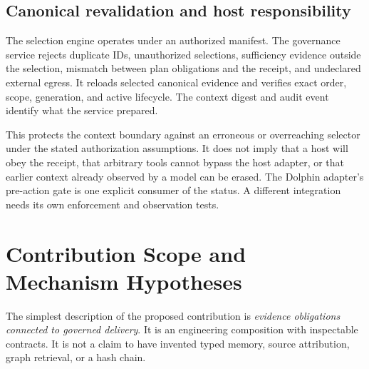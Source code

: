 \documentclass[10pt,twocolumn]{article}
\begin{document}
\subsection{Canonical revalidation and host responsibility}
The selection engine operates under an authorized manifest. The governance service rejects duplicate IDs, unauthorized selections, sufficiency evidence outside the selection, mismatch between plan obligations and the receipt, and undeclared external egress. It reloads selected canonical evidence and verifies exact order, scope, generation, and active lifecycle. The context digest and audit event identify what the service prepared.

This protects the context boundary against an erroneous or overreaching selector under the stated authorization assumptions. It does not imply that a host will obey the receipt, that arbitrary tools cannot bypass the host adapter, or that earlier context already observed by a model can be erased. The Dolphin adapter's pre-action gate is one explicit consumer of the status. A different integration needs its own enforcement and observation tests.

\section{Contribution Scope and Mechanism Hypotheses}
\label{sec:novelty}
The simplest description of the proposed contribution is \emph{evidence obligations connected to governed delivery}. It is an engineering composition with inspectable contracts. It is not a claim to have invented typed memory, source attribution, graph retrieval, or a hash chain.
\end{document}
